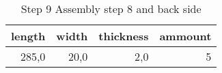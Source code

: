 \begin{table}[h!]
\centering
\caption{Step 9 Assembly step 8 and back side}
\begin{tabular}{rrrr}
\toprule
 length &  width &  thickness &  ammount \\
\midrule
  285,0 &   20,0 &        2,0 &        5 \\
\bottomrule
\end{tabular}
\end{table}
